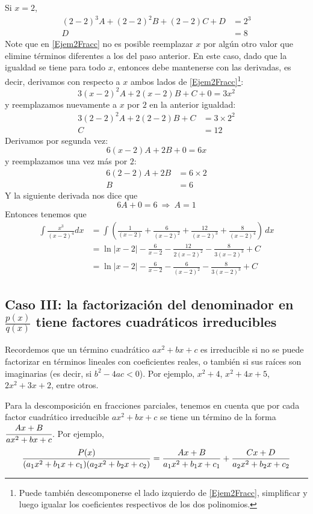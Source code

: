Si $x=2$,
\begin{align*}
(2-2)^{3}A+(2-2)^{2}B+(2-2)C+D&=2^{3} \\
D&=8
\end{align*}
Note que en \eqref{Ejem2Fracc} no es posible reemplazar $x$ por algún otro valor que elimine términos diferentes a los del paso anterior. En este caso, dado que la igualdad se tiene para todo $x$, entonces debe mantenerse con las derivadas, es decir, derivamos con respecto a $x$ ambos lados de \eqref{Ejem2Fracc}\footnote{ Puede también descomponerse el lado izquierdo de \eqref{Ejem2Fracc}, simplificar y luego igualar los coeficientes respectivos de los dos polinomios.}:
\[
3(x-2)^{2}A+2(x-2)B+C+0=3x^2
\]
y reemplazamos nuevamente a $x$ por $2$ en la anterior igualdad:
\begin{align*}
3(2-2)^{2}A+2(2-2)B+C&=3\times2^{2} \\
C&=12
\end{align*}
Derivamos por segunda vez:
\[
6(x-2)A+2B+0=6x
\]
y reemplazamos una vez más por $2$:
\begin{align*}
6(2-2)A+2B&=6\times 2 \\
B&=6
\end{align*}
Y la siguiente derivada nos dice que
\[
6A+0=6\ \Rightarrow\ A=1
\]
Entonces tenemos que
{\small
\begin{align*}
\int \frac{x^{3}}{(x-2)^{4}}dx&=\int\left( \frac{1}{(x-2)}+\frac{6}{(x-2)^{2}}+%
\frac{12}{(x-2)^{3}}+\frac{8}{(x-2)^{4}}\right)\, dx\\
&=\ln |x-2|-\frac{6}{x-2}-\frac{12}{2(x-2)^{2}}-\frac{8}{3(x-2)^{3}}+C\\
&=\ln |x-2|-\frac{6}{x-2}-\frac{6}{(x-2)^{2}}-\frac{8}{3(x-2)^{3}}+C 
\end{align*}
}

\subsection*{Caso III: la factorización del denominador en $\frac{p(x)}{q(x)}$ tiene factores cuadráticos irreducibles}

Recordemos que un término cuadrático $ax^{2}+bx+c$ es irreducible si no se puede factorizar en términos lineales con coeficientes reales, o también si sus raíces son imaginarias (es decir, si $b^2-4ac<0$). Por ejemplo, $x^{2}+4$, $x^{2}+4x+5$, $2x^2+3x+2$, entre otros.

Para la descomposición en fracciones parciales, tenemos en cuenta que por cada factor cuadrático irreducible $ax^2+bx+c$ se tiene un término de la forma {\footnotesize $\cfrac{Ax+B}{ax^2+bx+c}$.} Por ejemplo,
{\footnotesize
\[
\frac{P(x)}{(a_{1}x^{2}+b_{1}x+c_{1})(a_{2}x^{2}+b_{2}x+c_{2})}=\frac{Ax+B}{%
a_{1}x^{2}+b_{1}x+c_{1}}+\frac{Cx+D}{a_{2}x^{2}+b_{2}x+c_{2}}
\]
}

